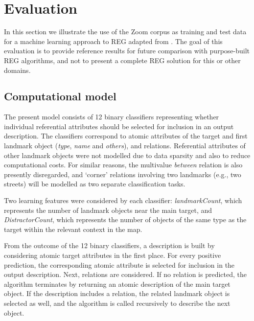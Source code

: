 \documentclass{article}
\begin{document}
\section{Evaluation}
\label{sec-eval}

In this section we illustrate the use of the Zoom corpus as training and test data for a machine learning approach to REG adapted from \cite{thiago-svm}. The  goal of this evaluation is to provide reference results for future comparison with purpose-built REG algorithms, and not to present a complete REG solution for this or other domains.

\subsection{Computational model}

The present model consists of 12 binary classifiers representing whether individual referential attributes should be selected for inclusion in an output description. The classifiers correspond to atomic attributes of the target and first landmark object ({\em type}, {\em name} and {\em others}), and relations. Referential attributes of other landmark objects were not modelled due to data sparsity and also to reduce computational costs. For similar reasons, the multivalue {\em between} relation is also presently disregarded, and `corner' relations involving two landmarks (e.g., two streets) will be modelled as two separate classification tasks.

Two learning features were considered by each classifier: {\em landmarkCount}, which represents the number of landmark objects near the main target, and {\em DistractorCount}, which represents the number of objects of the same type as the target within the relevant context in the map.

From the outcome of the 12 binary classifiers, a description is built by considering atomic target attributes in the first place. For every positive prediction, the corresponding atomic attribute is selected for inclusion in the output description. Next, relations are considered. If no relation is predicted, the algorithm terminates by returning an atomic description  of the main target object. If the description includes a relation, the related landmark object is selected  as well, and the algorithm is called recursively to describe the next object.
\end{document}
